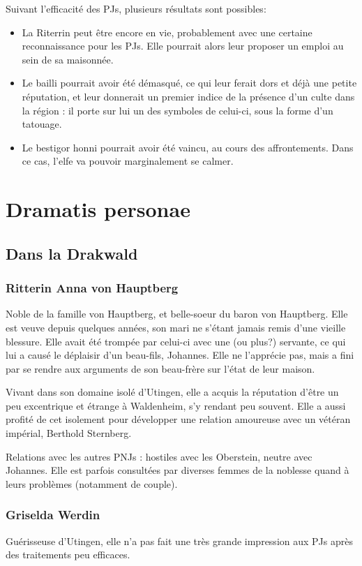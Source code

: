 \documentclass[10pt,a4paper]{book}
\begin{document}
Suivant l'efficacité des PJs, plusieurs résultats sont possibles:
\begin{itemize}
\item La Riterrin peut être encore en vie, probablement avec une certaine reconnaissance pour les PJs. Elle pourrait alors leur proposer un emploi au sein de sa maisonnée.
\item Le bailli pourrait avoir été démasqué, ce qui leur ferait dors et déjà une petite réputation, et leur donnerait un premier indice de la présence d'un culte dans la région : il porte sur lui un des symboles de celui-ci, sous la forme d'un tatouage.
\item Le bestigor honni pourrait avoir été vaincu, au cours des affrontements. Dans ce cas, l'elfe va pouvoir marginalement se calmer.
\end{itemize}
\chapter{Dramatis personae}
\section{Dans la Drakwald}
\subsection{Ritterin Anna von Hauptberg} Noble de la famille von Hauptberg, et belle-soeur du baron von Hauptberg. Elle est veuve depuis quelques années, son mari ne s'étant jamais remis d'une vieille blessure. Elle avait été trompée par celui-ci avec une (ou plus?) servante, ce qui lui a causé le déplaisir d'un beau-fils, Johannes. Elle ne l'apprécie pas, mais a fini par se rendre aux arguments de son beau-frère sur l'état de leur maison.

Vivant dans son domaine isolé d'Utingen, elle a acquis la réputation d'être un peu excentrique et étrange à Waldenheim, s'y rendant peu souvent. Elle a aussi profité de cet isolement pour développer une relation amoureuse avec un vétéran impérial, Berthold Sternberg. 

Relations avec les autres PNJs : hostiles avec les Oberstein, neutre avec Johannes. Elle est parfois consultées par diverses femmes de la noblesse quand à leurs problèmes (notamment de couple).
\subsection{Griselda Werdin}
Guérisseuse d'Utingen, elle n'a pas fait une très grande impression aux PJs après des traitements peu efficaces.
\end{document}
